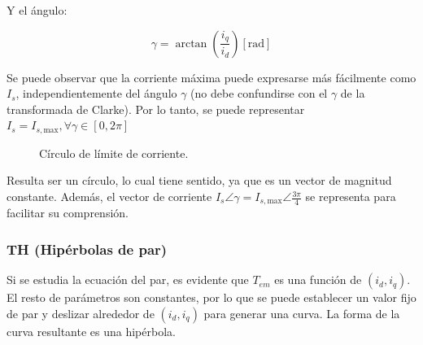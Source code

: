 Y el ángulo:

\begin{equation}
\gamma = \arctan\left(\frac{i_q}{i_d}\right) [\text{rad}]
\end{equation}

Se puede observar que la corriente máxima puede expresarse más fácilmente como $I_s$, independientemente del ángulo $\gamma$ (no debe confundirse con el $\gamma$ de la transformada de Clarke). Por lo tanto, se puede representar $I_s = I_{s,\text{max}} , \forall \gamma \in [0,2\pi]$

\begin{figure}[H]
	\centering
  \caption{Círculo de límite de corriente.}
\end{figure}


Resulta ser un círculo, lo cual tiene sentido, ya que es un vector de magnitud constante. Además, el vector de corriente $I_s\angle \gamma = I_{s,\text{max}} \angle{\frac{3\pi}{4}}$ se representa para facilitar su comprensión.


\subsubsection{TH (Hipérbolas de par)}

Si se estudia la ecuación del par, es evidente que \(T_{em}\) es una función de \((i_d, i_q)\). El resto de parámetros son constantes, por lo que se puede establecer un valor fijo de par y deslizar alrededor de \((i_d, i_q)\) para generar una curva. La forma de la curva resultante es una hipérbola.

